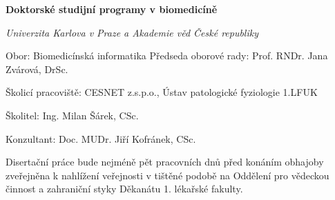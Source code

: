 \newpage
{}
\begin{center}
\textbf{Doktorské studijní programy v biomedicíně}

\textit{Univerzita Karlova v Praze a Akademie věd České republiky}
\end{center}
\normalsize

\vspace{2mm}

Obor: Biomedicínská informatika
\vfill
Předseda oborové rady: Prof. RNDr. Jana Zvárová, DrSc.
\vfill

Školicí pracoviště: CESNET z.s.p.o., Ústav patologické fyziologie 1.LFUK
\vfill


Školitel:  Ing. Milan Šárek, CSc.
\vfill

Konzultant:  Doc. MUDr. Jiří Kofránek, CSc. 
\vspace{100mm}

Disertační práce bude nejméně pět pracovních dnů před konáním obhajoby zveřejněna
k nahlížení veřejnosti v tištěné podobě na Oddělení pro vědeckou činnost a zahraniční styky
Děkanátu 1. lékařské fakulty.

